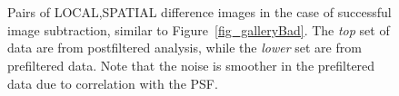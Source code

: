 \documentclass[prd, nofootinbib, floatfix, 11pt,tightenlines,times]{article}
\begin{document}
\begin{figure}
\begin{center}
 \\
 \\
\end{center}
\caption{Pairs of LOCAL,SPATIAL difference images in the case of
  successful image subtraction, similar to
  Figure~\ref{fig_galleryBad}.  The {\it top} set of data are from
  postfiltered analysis, while the {\it lower} set are from
  prefiltered data.  Note that the noise is smoother in the
  prefiltered data due to correlation with the PSF. }
\label{fig_galleryGood}
\end{figure}
\end{document}

